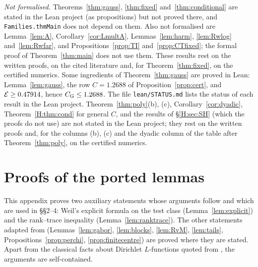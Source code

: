 \documentclass[11pt]{amsart}
\theoremstyle{definition}
\theoremstyle{remark}
\numberwithin{equation}{section}
\newcommand{\inputlemma}[1]{}
\begin{document}
\emph{Not formalised.} Theorems~\ref{thm:gauss}, \ref{thm:fixed} and~\ref{thm:conditional} are stated in the Lean project (as propositions) but not proved there, and \texttt{Families.thmMain} does not depend on them. Also not formalised are Lemma~\ref{lem:A}, Corollary~\ref{cor:LmultA}, Lemmas~\ref{lem:harm}, \ref{lem:Rwlog} and~\ref{lem:Rwfar}, and Propositions~\ref{prop:TI} and~\ref{prop:CTfixed}; the formal proof of Theorem~\ref{thm:main} does not use them. These results rest on the written proofs, on the cited literature and, for Theorem~\ref{thm:fixed}, on the certified numerics. Some ingredients of Theorem~\ref{thm:gauss} are proved in Lean: Lemma~\ref{lem:gauss}, the row $C=1.2688$ of Proposition~\ref{prop:cert}, and $\mathcal E\ge0.47914$, hence $C_{\mathrm G}\le1.2688$. The file \texttt{lean/STATUS.md} lists the status of each result in the Lean project. Theorem~\ref{thm:poly}(b), (c), Corollary~\ref{cor:dyadic}, Theorem~\ref{H:thm:cond} for general $C$, and the results of \S\ref{H:sec:SH} (which the proofs do not use) are not stated in the Lean project; they rest on the written proofs and, for the columns (b), (c) and the dyadic column of the table after Theorem~\ref{thm:poly}, on the certified numerics.

\inputlemma{constants}

\clearpage %
\section{Proofs of the ported lemmas}\label{app:ported}
This appendix proves two auxiliary statements whose arguments follow \cite{AF26,HY26} and which are used in \S\S2--4: Weil's explicit formula on the test class (Lemma~\ref{lem:explicit}) and the rank--trace inequality (Lemma~\ref{lem:ranktrace}). The other statements adapted from \cite{HY26} (Lemmas~\ref{lem:gabor}, \ref{lem:blocks}, \ref{lem:RvM}, \ref{lem:tails}, Propositions~\ref{prop:perchi}, \ref{prop:finitecentre}) are proved where they are stated. Apart from the classical facts about Dirichlet $L$-functions quoted from \cite{Dav}, the arguments are self-contained.
\end{document}

